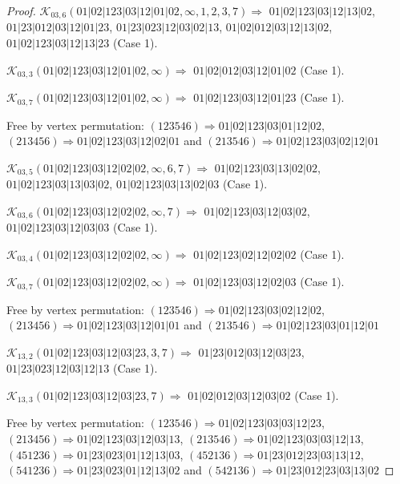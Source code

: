 \documentclass[12pt]{article}
\theoremstyle{plain}
\theoremstyle{definition}
\theoremstyle{remark}
\newcommand{\fancy}[1]{\mathcal{#1}}
\def\K{\fancy{K}}
\begin{document}
\begin{proof}
	
	
	\bigskip
	
	$\K_{03,6}(01|02|123|03|12|01|02,\infty,1, 2, 3, 7)\Rightarrow $ $01|02|123|03|12|13|02$, $01|23|012|03|12|01|23$, $01|23|023|12|03|02|13$, $01|02|012|03|12|13|02$, $01|02|123|03|12|13|23$ (Case 1).
	
	$\K_{03,3}(01|02|123|03|12|01|02,\infty)\Rightarrow $ $01|02|012|03|12|01|02$ (Case 1).
	
	$\K_{03,7}(01|02|123|03|12|01|02,\infty)\Rightarrow $ $01|02|123|03|12|01|23$ (Case 1).
	
	
	
	Free by vertex permutation: $(1 2 3 5 4 6)\Rightarrow 01|02|123|03|01|12|02$, $(2 1 3 4 5 6)\Rightarrow 01|02|123|03|12|02|01$ and $(2 1 3 5 4 6)\Rightarrow 01|02|123|03|02|12|01$
	
	
	
	\bigskip
	
	$\K_{03,5}(01|02|123|03|12|02|02,\infty,6, 7)\Rightarrow $ $01|02|123|03|13|02|02$, $01|02|123|03|13|03|02$, $01|02|123|03|13|02|03$ (Case 1).
	
	$\K_{03,6}(01|02|123|03|12|02|02,\infty,7)\Rightarrow $ $01|02|123|03|12|03|02$, $01|02|123|03|12|03|03$ (Case 1).
	
	$\K_{03,4}(01|02|123|03|12|02|02,\infty)\Rightarrow $ $01|02|123|02|12|02|02$ (Case 1).
	
	$\K_{03,7}(01|02|123|03|12|02|02,\infty)\Rightarrow $ $01|02|123|03|12|02|03$ (Case 1).
	
	
	
	Free by vertex permutation: $(1 2 3 5 4 6)\Rightarrow 01|02|123|03|02|12|02$, $(2 1 3 4 5 6)\Rightarrow 01|02|123|03|12|01|01$ and $(2 1 3 5 4 6)\Rightarrow 01|02|123|03|01|12|01$
	
	
	
	\bigskip
	
	$\K_{13,2}(01|02|123|03|12|03|23,3, 7)\Rightarrow $ $01|23|012|03|12|03|23$, $01|23|023|12|03|12|13$ (Case 1).
	
	$\K_{13,3}(01|02|123|03|12|03|23,7)\Rightarrow $ $01|02|012|03|12|03|02$ (Case 1).
	
	
	
	Free by vertex permutation: $(1 2 3 5 4 6)\Rightarrow 01|02|123|03|03|12|23$, $(2 1 3 4 5 6)\Rightarrow 01|02|123|03|12|03|13$, $(2 1 3 5 4 6)\Rightarrow 01|02|123|03|03|12|13$, $(4 5 1 2 3 6)\Rightarrow 01|23|023|01|12|13|03$, $(4 5 2 1 3 6)\Rightarrow 01|23|012|23|03|13|12$, $(5 4 1 2 3 6)\Rightarrow 01|23|023|01|12|13|02$ and $(5 4 2 1 3 6)\Rightarrow 01|23|012|23|03|13|02$
	

\end{proof}
\end{document}
